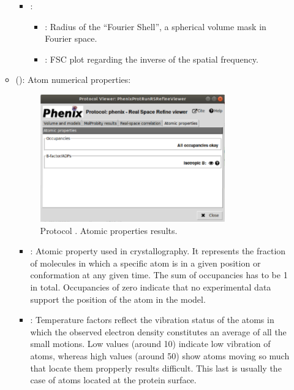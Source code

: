 \begin{itemize}
\begin{itemize}
\begin{itemize}
         \item {}:
          \begin{itemize}
           \item {}: Radius of the ``Fourier Shell'', a spherical volume mask in Fourier space.
           \item {}: FSC plot regarding the inverse of the spatial frequency.
          \end{itemize}
        \end{itemize}
      \item {} (): Atom numerical properties:
       \begin{figure}[H]
         \centering 
         \captionsetup{width=.7\linewidth} 
         \includegraphics[width=0.80\textwidth]{Images_appendix/Fig152.pdf}
         \caption{Protocol . Atomic properties results.}
         \label{fig:app_protocol_real_space_refine_5}
        \end{figure}
        \begin{itemize}
         \item {}: Atomic property used in crystallography. It represents the fraction of molecules in which a specific atom is in a given position or conformation at any given time. The sum of occupancies has to be 1 in total. Occupancies of zero indicate that no experimental data support the position of the atom in the model.
         \item {}: Temperature factors reflect the vibration status of the atoms in which the observed electron density constitutes an average of all the small motions. Low values (around 10) indicate low vibration of atoms, whereas high values (around 50) show atoms moving so much that locate them propperly results difficult. This last is usually the case of atoms located at the protein surface.

\end{itemize}
\end{itemize}
\end{itemize}
